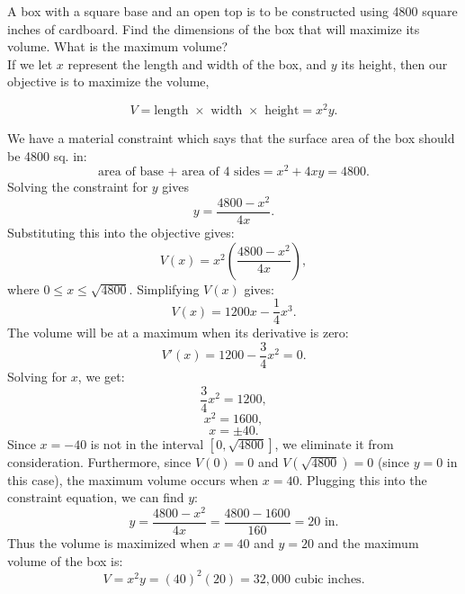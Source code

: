 \documentclass[handout]{ximera}
\begin{document}
\begin{example}[example 2]
A box with a square base and an open top is to be constructed using 4800 square inches of cardboard.  
Find the dimensions of the box that will maximize its volume.  What is the maximum volume?\\

If we let $x$ represent the length and width of the box, and $y$ its height, then our objective is to maximize 
the volume,


\begin{image}
\end{image}

\[V = \text{length $\times$ width $\times$ height} = x^2y.\]

We have a material constraint which says that the surface area of the box should be 4800 sq. in:
\[\text{area of base + area of 4 sides} = x^2 + 4xy = 4800.\]
Solving the constraint for $y$ gives
\[y = \frac{4800 - x^2}{4x}.\]
Substituting this into the objective gives:
\[V(x) = x^2 \left(\frac{4800 - x^2}{4x}\right),\]
where $0\leq x \leq \sqrt{4800}$.
Simplifying $V(x)$ gives:
\[V(x) = 1200x - \frac14 x^3.\]
The volume will be at a maximum when its derivative is zero:
\[V'(x) = 1200 - \frac34 x^2 = 0.\]
Solving for $x$, we get:
\[ \frac34 x^2 = 1200, \]
\[x^2 = 1600,\]
\[x = \pm 40.\]
Since $x=-40$ is not in the interval $[0, \sqrt{4800}]$, we eliminate it from consideration. 
Furthermore, since $V(0) = 0$ and $V(\sqrt{4800})= 0$ (since $y=0$ in this case), the maximum volume occurs when $x = 40$.
Plugging this into the constraint equation, we can find $y$:
\[y = \frac{4800 - x^2}{4x} = \frac{4800 - 1600}{160} = 20 \mbox{ in.}\]
Thus the volume is maximized when $x = 40$ and $y = 20$ and the maximum volume of the box is:
\[V = x^2y = (40)^2 (20) = 32{,}000 \mbox{ cubic inches}.\]

\end{example}


\begin{center}
\begin{foldable}
\end{foldable}
\end{center}
\end{document}

